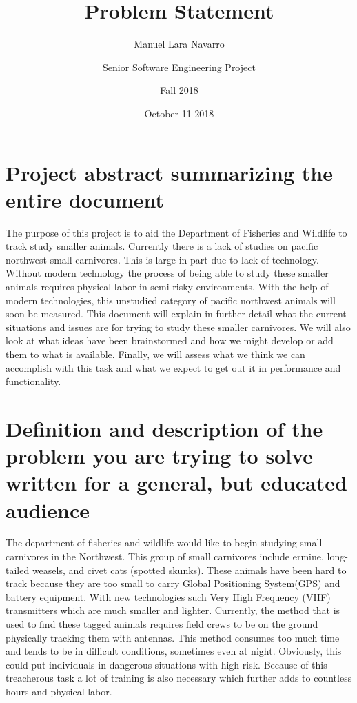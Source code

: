 \documentclass[10pt, draftclsnofoot,onecolumn, letterpaper]{IEEEtran}
\title{Problem Statement}
\author{
  Manuel Lara Navarro\\
  \and
  Senior Software Engineering Project\\
  \and
  Fall 2018\\
  \and
  October 11 2018\\
}
\begin{document}
\maketitle

\section{Project abstract summarizing the entire document}

The purpose of this project is to aid the Department of Fisheries and Wildlife to track study smaller animals. Currently there is a lack of studies on pacific northwest small carnivores. This is large in part due to lack of technology. Without modern technology the process of being able to study these smaller animals requires physical labor in semi-risky environments. With the help of modern technologies, this unstudied category of pacific northwest animals will soon be measured. This document will explain in further detail what the current situations and issues are for trying to study these smaller carnivores. We will also look at what ideas have been brainstormed and how we might develop or add them to what is available. Finally, we will assess what we think we can accomplish with this task and what we expect to get out it in performance and functionality.

\newpage{}

\section{Definition and description of the problem you are trying to solve written for a general, but educated audience}

The department of fisheries and wildlife would like to begin studying small carnivores in the Northwest. This group of small carnivores include ermine, long-tailed weasels, and civet cats (spotted skunks). These animals have been hard to track because they are too small to carry Global Positioning System(GPS) and battery equipment. With new technologies such Very High Frequency (VHF) transmitters which are much smaller and lighter. Currently, the method that is used to find these tagged animals requires field crews to be on the ground physically tracking them with antennas. This method consumes too much time and tends to be in difficult conditions, sometimes even at night. Obviously, this could put individuals in dangerous situations with high risk. Because of this treacherous task a lot of training is also necessary which further adds to countless hours and physical labor.
\end{document}
